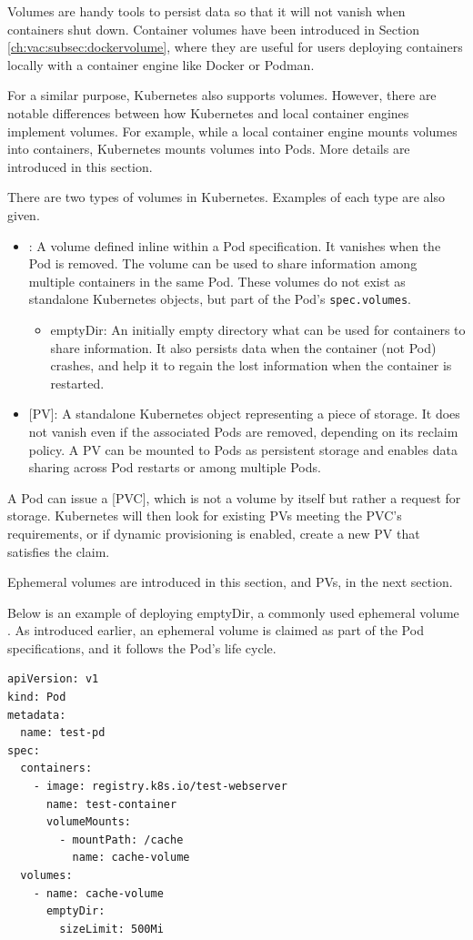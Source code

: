 Volumes are handy tools to persist data so that it will not vanish when containers shut down. Container volumes have been introduced in Section \ref{ch:vac:subsec:dockervolume}, where they are useful for users deploying containers locally with a container engine like Docker or Podman.

For a similar purpose, Kubernetes also supports volumes. However, there are notable differences between how Kubernetes and local container engines implement volumes. For example, while a local container engine mounts volumes into containers, Kubernetes mounts volumes into Pods. More details are introduced in this section.

There are two types of volumes in Kubernetes. Examples of each type are also given.
\begin{itemize}
  \item {}: A volume defined inline within a Pod specification. It vanishes when the Pod is removed. The volume can be used to share information among multiple containers in the same Pod. These volumes do not exist as standalone Kubernetes objects, but part of the Pod's \verb|spec.volumes|.
      \begin{itemize}
        \item emptyDir: An initially empty directory what can be used for containers to share information. It also persists data when the container (not Pod) crashes, and help it to regain the lost information when the container is restarted.
      \end{itemize}
  \item {}[PV]: A standalone Kubernetes object representing a piece of storage. It does not vanish even if the associated Pods are removed, depending on its reclaim policy. A PV can be mounted to Pods as persistent storage and enables data sharing across Pod restarts or among multiple Pods.
\end{itemize}
A Pod can issue a [PVC], which is not a volume by itself but rather a request for storage. Kubernetes will then look for existing PVs meeting the PVC's requirements, or if dynamic provisioning is enabled, create a new PV that satisfies the claim.

Ephemeral volumes are introduced in this section, and PVs, in the next section.

Below is an example of deploying emptyDir, a commonly used ephemeral volume \cite{kubernetes2024doc}. As introduced earlier, an ephemeral volume is claimed as part of the Pod specifications, and it follows the Pod's life cycle. 
\begin{lstlisting}
apiVersion: v1
kind: Pod
metadata:
  name: test-pd
spec:
  containers:
    - image: registry.k8s.io/test-webserver
      name: test-container
      volumeMounts:
        - mountPath: /cache
          name: cache-volume
  volumes:
    - name: cache-volume
      emptyDir:
        sizeLimit: 500Mi
\end{lstlisting}

